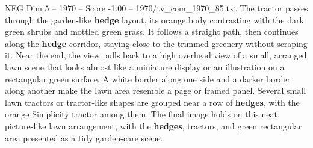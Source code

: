 \begin{textsample}{NEG Dim 5 – 1970 – Score -1.00 – 1970/tv\_com\_1970\_85.txt}
The tractor passes through the garden-like \textbf{hedge} layout, its orange body contrasting with the dark green shrubs and mottled green grass.
It follows a straight path, then continues along the \textbf{hedge} corridor, staying close to the trimmed greenery without scraping it.
Near the end, the view pulls back to a high overhead view of a small, arranged lawn scene that looks almost like a miniature display or an illustration on a rectangular green surface.
A white border along one side and a darker border along another make the lawn area resemble a page or framed panel.
Several small lawn tractors or tractor-like shapes are grouped near a row of \textbf{hedges}, with the orange Simplicity tractor among them.
The final image holds on this neat, picture-like lawn arrangement, with the \textbf{hedges}, tractors, and green rectangular area presented as a tidy garden-care scene.

\end{textsample}
